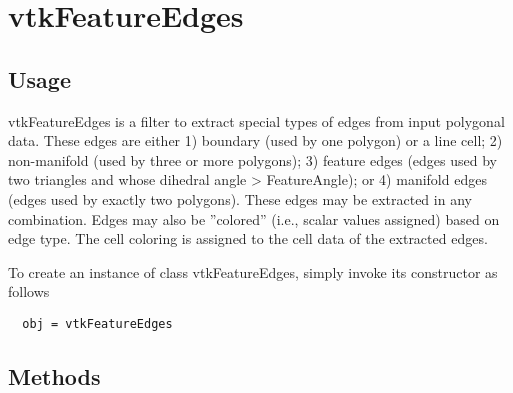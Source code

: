 \section{vtkFeatureEdges}

\subsection{Usage}

 vtkFeatureEdges is a filter to extract special types of edges from
 input polygonal data. These edges are either 1) boundary (used by 
 one polygon) or a line cell; 2) non-manifold (used by three or more 
 polygons); 3) feature edges (edges used by two triangles and whose
 dihedral angle > FeatureAngle); or 4) manifold edges (edges used by
 exactly two polygons). These edges may be extracted in any
 combination. Edges may also be ''colored'' (i.e., scalar values assigned)
 based on edge type. The cell coloring is assigned to the cell data of
 the extracted edges.

To create an instance of class vtkFeatureEdges, simply
invoke its constructor as follows
\begin{verbatim}
  obj = vtkFeatureEdges
\end{verbatim}
\subsection{Methods}

